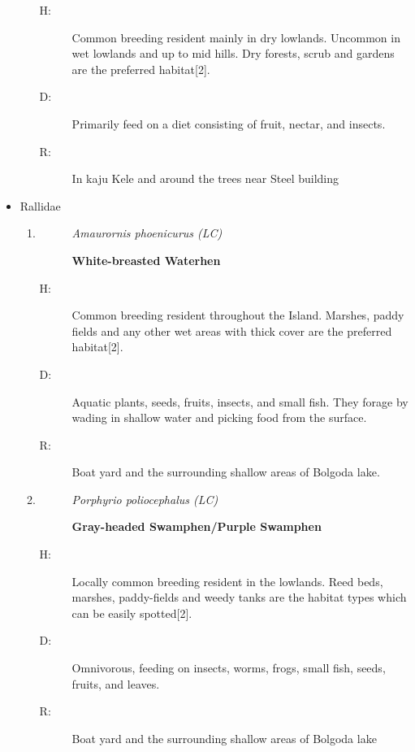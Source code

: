 \begin{itemize}
\begin{enumerate}
\begin{description}
\item[H: ]%
Common breeding resident mainly in dry lowlands. Uncommon in wet lowlands and up to mid hills. Dry forests, scrub and gardens are the preferred habitat{[}2{]}.%
\item[D: ]%
Primarily feed on a diet consisting of fruit, nectar, and insects.%
\item[R: ]%
In kaju Kele and around the trees near Steel building%
\end{description}%
\end{enumerate}%
\item%
Rallidae%
\begin{enumerate}%
\item%
\begin{description}%
\item[]%
\textit{Amaurornis phoenicurus (LC)}%
\item[]%
\textbf{White{-}breasted Waterhen}%
\end{description}%
\begin{description}%
\item[H: ]%
Common breeding resident throughout the Island. Marshes, paddy fields and any other wet areas with thick cover are the preferred habitat{[}2{]}.%
\item[D: ]%
Aquatic plants, seeds, fruits, insects, and small fish. They forage by wading in shallow water and picking food from the surface.%
\item[R: ]%
Boat yard and the surrounding shallow areas of Bolgoda lake.%
\end{description}%
\item%
\begin{description}%
\item[]%
\textit{Porphyrio poliocephalus (LC)}%
\item[]%
\textbf{Gray{-}headed Swamphen/Purple Swamphen}%
\end{description}%
\begin{description}%
\item[H: ]%
Locally common breeding resident in the lowlands. Reed beds, marshes, paddy-fields and weedy tanks are the habitat types which can be easily spotted{[}2{]}.%
\item[D: ]%
Omnivorous, feeding on insects, worms, frogs, small fish, seeds, fruits, and leaves.%
\item[R: ]%
Boat yard and the surrounding shallow areas of Bolgoda lake%
\end{description}%
\end{enumerate}%

\end{itemize}
